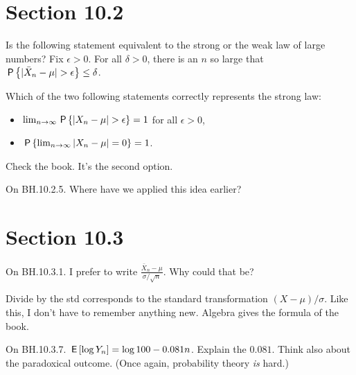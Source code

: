 \section{Section 10.2}
\label{sec:section-10.2}

\begin{exercise}
Is the following statement equivalent to the strong or the weak law of large numbers?
Fix $\epsilon>0$. For all $\delta>0$, there is an $n$ so large that $\P{|\bar X_n-\mu|>\epsilon} \leq \delta$.
\begin{hint}
\end{hint}
\begin{solution}
\end{solution}
\end{exercise}

\begin{exercise}
Which of the two following statements correctly represents the strong law:
\begin{itemize}
\item $\lim_{n\to\infty} \P{|X_n-\mu|>\epsilon} = 1$ for all $\epsilon>0$,
\item $\P{\lim_{n\to\infty} |X_n-\mu|=0} = 1$.
\end{itemize}
\begin{solution}
Check the book. It's the second option.
\end{solution}
\end{exercise}

\begin{exercise}
On BH.10.2.5. Where have we applied this idea earlier?
\end{exercise}



\section{Section 10.3}
\label{sec:section-10.3}

\begin{exercise}
On BH.10.3.1. I prefer to write $\frac{\bar X_n-\mu}{\sigma/\sqrt n}$. Why could that be?
\begin{solution}
Divide by the std corresponds to the standard transformation $(X-\mu)/\sigma$. Like this, I don't have to remember anything new. Algebra gives the formula of the book.
\end{solution}
\end{exercise}


\begin{exercise}
On BH.10.3.7. $\E{\log Y_n}=\log 100 - 0.081n$. Explain the $0.081$. Think also about the paradoxical outcome. (Once again, probability theory \emph{is} hard.)
\begin{hint}
\end{hint}
\begin{solution}
\end{solution}
\end{exercise}

